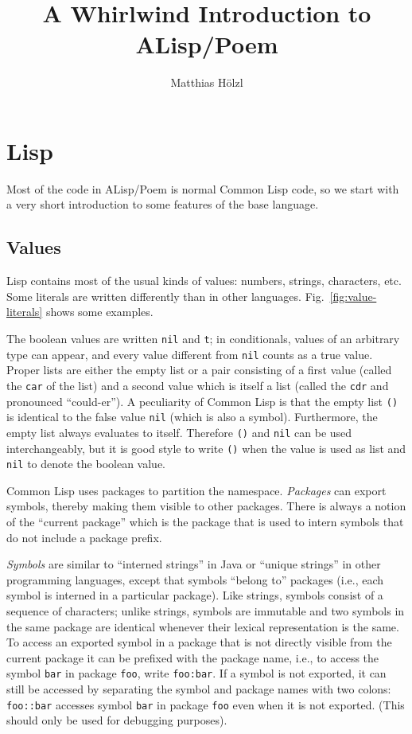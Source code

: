 \documentclass[a4paper]{amsart}
\begin{document}
\title{A Whirlwind Introduction to ALisp/Poem}
\author{Matthias H\"olzl}

\maketitle

\section{Lisp}
\label{sec:lisp}

Most of the code in ALisp/Poem is normal Common Lisp code, so we start
with a very short introduction to some features of the base language.

\subsection{Values}
\label{sec:values}

Lisp contains most of the usual kinds of values: numbers, strings,
characters, etc.  Some literals are written differently than in other
languages.  Fig.~\ref{fig:value-literals} shows some examples.

The boolean values are written \texttt{nil} and \texttt{t}; in
conditionals, values of an arbitrary type can appear, and every value
different from \texttt{nil} counts as a true value.  Proper lists are
either the empty list or a pair consisting of a first value (called
the \texttt{car} of the list) and a second value which is itself a
list (called the \texttt{cdr} and pronounced ``could-er'').  A
peculiarity of Common Lisp is that the empty list \texttt{()} is
identical to the false value \texttt{nil} (which is also a symbol).
Furthermore, the empty list always evaluates to itself.  Therefore
\texttt{()} and \texttt{nil} can be used interchangeably, but it is
good style to write \texttt{()} when the value is used as list and
\texttt{nil} to denote the boolean value.

Common Lisp uses packages to partition the namespace.  \emph{Packages}
can export symbols, thereby making them visible to other packages.
There is always a notion of the ``current package'' which is the
package that is used to intern symbols that do not include a package
prefix.

\emph{Symbols} are similar to ``interned strings'' in Java or ``unique
strings'' in other programming languages, except that symbols ``belong
to'' packages (i.e., each symbol is interned in a particular package).
Like strings, symbols consist of a sequence of characters; unlike
strings, symbols are immutable and two symbols in the same package are
identical whenever their lexical representation is the same.  To
access an exported symbol in a package that is not directly visible
from the current package it can be prefixed with the package name,
i.e., to access the symbol \texttt{bar} in package \texttt{foo}, write
\texttt{foo:bar}.  If a symbol is not exported, it can still be
accessed by separating the symbol and package names with two colons:
\texttt{foo::bar} accesses symbol \texttt{bar} in package \texttt{foo}
even when it is not exported.  (This should only be used for debugging
purposes).  
\end{document}
